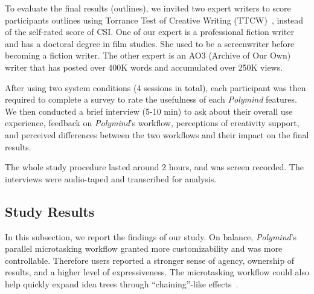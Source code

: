 To evaluate the final results (outlines), we invited two expert writers to score participants outlines using Torrance Test of Creative Writing (TTCW)~\cite{chakrabarty2023art}, instead of the self-rated score of CSI. 
One of our expert is a professional fiction writer and has a doctoral degree in film studies. She used to be a screenwriter before becoming a fiction writer. The other expert is an AO3 (Archive of Our Own) writer that has posted over 400K words and accumulated over 250K views.

After using two system conditions (4 sessions in total), each participant was then required to complete a survey to rate the usefulness of each \textit{Polymind} features. We then conducted a brief interview (5-10 min) to ask about their overall use experience, feedback on \textit{Polymind}'s workflow, perceptions of creativity support, and perceived differences between the two workflows and their impact on the final results.

The whole study procedure lasted around 2 hours, and was screen recorded. The interviews were audio-taped and transcribed for analysis.

% 

\subsection{Study Results}
In this subsection, we report the findings of our study. On balance, \textit{Polymind}'s parallel microtasking workflow granted more customizability and was more controllable. Therefore users reported a stronger sense of agency, ownership of results, and a higher level of expressiveness. The microtasking workflow could also help quickly expand idea trees through ``chaining''-like effects~\cite{wu2022ai}.



